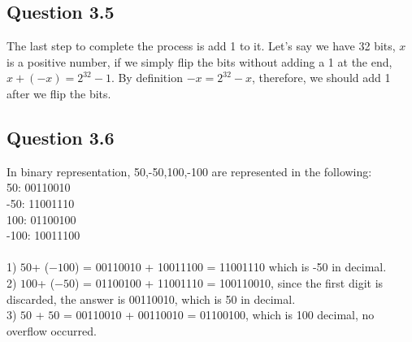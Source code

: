 \documentclass[11pt]{article} %
\begin{document}
\subsection{Question 3.5}
The last step to complete the process is add 1 to it. Let's say we have 32 bits, $x$ is a positive number, if we simply flip the bits without adding a 1 at the end, $x + (-x) = 2^{32}-1$. By definition $-x = 2^{32}-x$, therefore, we should add 1 after we flip the bits.
\subsection{Question 3.6}
In binary representation, 50,-50,100,-100 are represented in the following:\\
50: 00110010\\
-50: 11001110\\
100: 01100100\\
-100: 10011100\\\\
1) $50$+ ($-100$) = 00110010 + 10011100 =  11001110 which is -50 in decimal.\\
2) $100$+ ($-50$) = 01100100 + 11001110 = 100110010, since the first digit is discarded, the answer is 00110010, which is 50 in decimal.\\
3) $50$ + $50$ = 00110010 +  00110010 = 01100100, which is 100 decimal, no overflow occurred.
\end{document}
